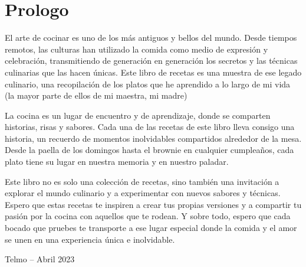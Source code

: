 \section*{Prologo}


El arte de cocinar es uno de los más antiguos y bellos del mundo. Desde tiempos remotos, las culturas han utilizado la comida como medio de expresión y celebración, transmitiendo de generación en generación los secretos y las técnicas culinarias que las hacen únicas. Este libro de recetas es una muestra de ese legado culinario, una recopilación de los platos que he aprendido a lo largo de mi vida (la mayor parte de ellos de mi maestra, mi madre) 

La cocina es un lugar de encuentro y de aprendizaje, donde se comparten historias, risas y sabores. Cada una de las recetas de este libro lleva consigo una historia, un recuerdo de momentos inolvidables compartidos alrededor de la mesa. Desde la paella de los domingos hasta el brownie en cualquier cumpleaños, cada plato tiene su lugar en nuestra memoria y en nuestro paladar. 

Este libro no es solo una colección de recetas, sino también una invitación a explorar el mundo culinario y a experimentar con nuevos sabores y técnicas. Espero que estas recetas te inspiren a crear tus propias versiones y a compartir tu pasión por la cocina con aquellos que te rodean. Y sobre todo, espero que cada bocado que pruebes te transporte a ese lugar especial donde la comida y el amor se unen en una experiencia única e inolvidable. 

Telmo – Abril 2023